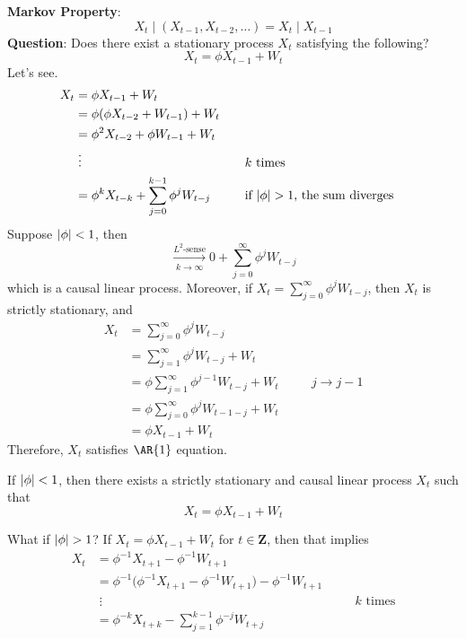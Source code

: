 \textbf{Markov Property}:
\[ X_t\mid (X_{t-1},X_{t-2},\ldots)=X_t\mid X_{t-1} \]
\textbf{Question}: Does there exist a stationary process
$ X_t $ satisfying the following?
\[ X_t=\phi X_{t-1}+W_t \]
Let's see.
\begin{align*}
    X_t
     & =\phi X_{t-1}+W_t                                                                                      \\
     & =\phi(\phi X_{t-2}+W_{t-1})+W_t                                                                        \\
     & =\phi^2X_{t-2}+\phi W_{t-1}+W_t                                                                        \\
     & \;\vdots                                        & \quad & k\text{ times}                               \\
     & =\phi^k X_{t-k}+\sum_{j=0}^{k-1} \phi^j W_{t-j} & \quad & \text{if $ \lvert\phi\rvert>1 $, the sum diverges} \\
\end{align*}
Suppose $ \lvert\phi\rvert<1 $, then
\[ \xrightarrow[k\to\infty]{L^2\text{-sense}}0+
    \sum_{j=0}^{\infty} \phi^j W_{t-j} \]
which is a causal linear process. Moreover, if
$ X_t=\sum_{j=0}^{\infty} \phi^j W_{t-j} $, then
$ X_t $ is strictly stationary, and
\begin{align*}
    X_t
     & =\sum_{j=0}^{\infty} \phi^j W_{t-j}                                \\
     & =\sum_{j=1}^{\infty}\phi^j W_{t-j}+W_t                             \\
     & =\phi \sum_{j=1}^{\infty} \phi^{j-1}W_{t-j}+W_t & \quad & j\to j-1 \\
     & =\phi \sum_{j=0}^{\infty} \phi^j W_{t-1-j}+W_t                     \\
     & =\phi X_{t-1}+W_t
\end{align*}
Therefore, $ X_t $ satisfies $ \AR{1} $ equation.
\begin{Theorem}{}{}
    If $ \lvert\phi\rvert<1 $, then there exists a strictly stationary
    and causal linear process $ X_t $ such that
    \[ X_t=\phi X_{t-1}+W_t \]
\end{Theorem}
What if $ \lvert\phi\rvert>1 $? If $ X_t=\phi X_{t-1}+W_t $ for $ t\in\mathbf{Z} $,
then that implies
\begin{align*}
    X_t
     & =\phi^{-1}X_{t+1}-\phi^{-1}W_{t+1}                                                                \\
     & =\phi^{-1}\bigl(\phi^{-1}X_{t+1}-\phi^{-1}W_{t+1}\bigr)-\phi^{-1}W_{t+1}                          \\
     & \;\vdots                                                                 & \quad & k\text{ times} \\
     & =\phi^{-k}X_{t+k}-\sum_{j=1}^{k-1} \phi^{-j}W_{t+j}
\end{align*}
